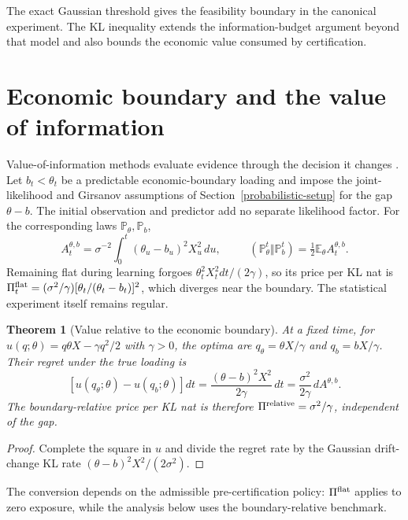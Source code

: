 \documentclass[11pt]{article}
\numberwithin{equation}{section}
\theoremstyle{plain}
\newtheorem{theorem}{Theorem}[section]
\theoremstyle{definition}
\theoremstyle{remark}
\DeclareMathOperator{\KL}{D_{\mathrm{KL}}}
\begin{document}
The exact Gaussian threshold gives the feasibility boundary in the canonical
experiment. The KL inequality extends the information-budget argument beyond
that model and also bounds the economic value consumed by certification.

\section{Economic boundary and the value of information}\label{economic-nulls-and-information-geometry}

Value-of-information methods evaluate evidence through the decision it changes \cite{jaimungalshi2024,lehrerwang2024,anand2010,zhong2026}. Let $b_t<\theta_t$ be a predictable economic-boundary loading and impose the joint-likelihood and Girsanov assumptions of Section~\ref{probabilistic-setup} for the gap $\theta-b$. The initial observation and predictor add no separate likelihood factor. For the corresponding laws $\mathbb P_\theta,\mathbb P_b$,
\[
A_t^{\theta,b}=\sigma^{-2}\int_0^t(\theta_u-b_u)^2X_u^2\,du,
\qquad \KL(\mathbb P_\theta^t\Vert\mathbb P_b^t)=\tfrac12\mathbb E_\theta A_t^{\theta,b}.
\]
Remaining flat during learning forgoes $\theta_t^2X_t^2dt/(2\gamma)$, so its price per KL nat is $\Pi_t^{\rm flat}=(\sigma^2/\gamma)[\theta_t/(\theta_t-b_t)]^2$, which diverges near the boundary. The statistical experiment itself remains regular.

\begin{theorem}[Value relative to the economic boundary]\label{thm:boundary-relative-value}
At a fixed time, for $u(q;\theta)=q\theta X-\gamma q^2/2$ with $\gamma>0$, the optima are $q_\theta=\theta X/\gamma$ and $q_b=bX/\gamma$. Their regret under the true loading is
\[
[u(q_\theta;\theta)-u(q_b;\theta)]dt
=\frac{(\theta-b)^2X^2}{2\gamma}\,dt
=\frac{\sigma^2}{2\gamma}\,dA^{\theta,b}.
\]
The boundary-relative price per KL nat is therefore $\Pi^{\rm relative}=\sigma^2/\gamma$, independent of the gap.
\end{theorem}
\begin{proof} Complete the square in $u$ and divide the regret rate by the Gaussian drift-change KL rate $(\theta-b)^2X^2/(2\sigma^2)$.\end{proof}
The conversion depends on the admissible pre-certification policy: $\Pi^{\rm flat}$ applies to zero exposure, while the analysis below uses the boundary-relative benchmark.
\end{document}
